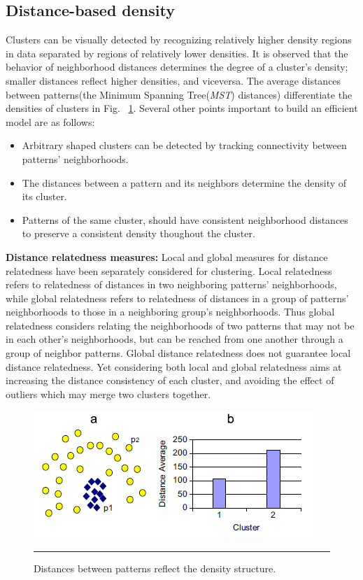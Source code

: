 \subsection{Distance-based density}\label{subsec:dist_density}
Clusters can be visually detected by recognizing relatively higher density regions in data separated by regions of relatively lower densities. It is observed that the behavior of neighborhood distances determines the degree of a cluster's density; smaller distances reflect higher densities, and viceversa. The average distances between patterns(the Minimum
Spanning Tree(\textit{MST}) distances) differentiate the densities of clusters in Fig. ~\ref{fig:mitosis_1}. Several other points important to build an efficient model are as follows:
\begin{itemize}
\item Arbitrary shaped clusters can be detected by tracking connectivity between patterns' neighborhoods.
\item The distances between a pattern and its neighbors determine the density of its cluster.
\item Patterns of the same cluster, should have consistent neighborhood distances to preserve a consistent density thoughout the cluster.
\end{itemize}
\textbf{Distance relatedness measures:} Local and global measures for distance relatedness have been separately considered for clustering. Local relatedness refers to relatedness of distances in two neighboring patterns' neighborhoods, while global relatedness refers to relatedness of distances in a group of patterns' neighborhoods to those in a neighboring group's neighborhoods. Thus global relatedness considers relating the neighborhoods of two patterns that may not be in each other's neighborhoods, but can be reached from one another through a group of neighbor patterns. Global distance relatedness does not guarantee local distance relatedness. Yet considering both local and global relatedness aims at increasing the distance consistency of each cluster, and avoiding the effect of outliers which may merge two clusters together.

\begin{figure}[htbp]
	\centering
		\includegraphics{./Figures/Mitosis_1.png}
		\rule{35em}{0.5pt}
	\caption[Distances between patterns reflect the density structure.]{Distances between patterns reflect the density structure.}
	\label{fig:mitosis_1}
\end{figure}

